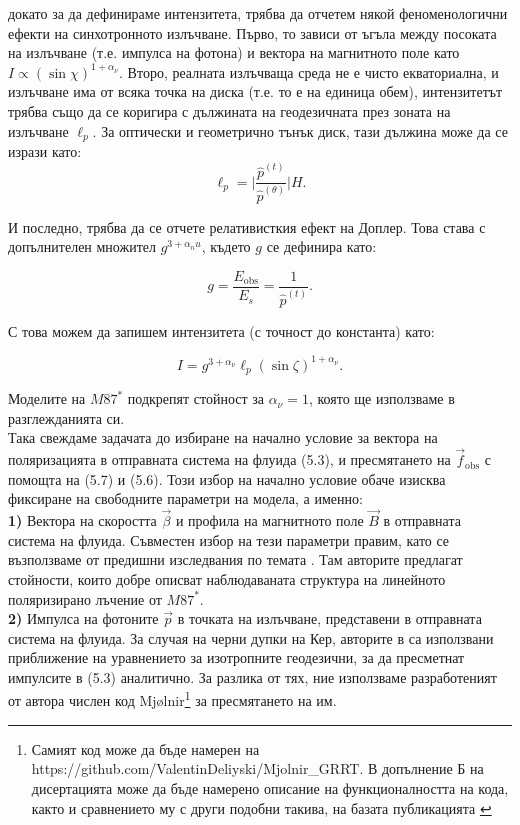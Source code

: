 \documentclass[12pt]{article}
\numberwithin{equation}{section}
\numberwithin{figure}{section}
\begin{document}
	\noindent докато за да дефинираме интензитета, трябва да отчетем някой феноменологични ефекти на синхотронното излъчване. Първо, то зависи от ъгъла между посоката на излъчване (т.е. импулса на фотона) и вектора на магнитното поле като $I\propto \left(\sin\chi\right)^{1+\alpha_\nu}$. Второ, реалната излъчваща среда не е чисто екваториална, и излъчване има от всяка точка на диска (т.е. то е на единица обем), интензитетът трябва също да се коригира с дължината на геодезичната през зоната на излъчване $\ell_p$. За оптически и геометрично тънък диск, тази дължина може да се изрази като:
	\begin{equation}
		\ell_p = \bigg\vert\frac{\hat{p}^{(t)}}{\hat{p}^{(\theta)}}\bigg\vert H.
	\end{equation}
	
	\noindent И последно, трябва да се отчете релативисткия ефект на Доплер. Това става с допълнителен множител $g^{3 + \alpha_nu}$, където $g$ се дефинира като:
	
	\begin{equation}
			g = \frac{E_\text{obs}}{E_s} = \frac{1}{\hat{p}^{(t)}}.
	\end{equation}
	
	\noindent С това можем да запишем интензитета (с точност до константа) като:
	
	\begin{equation}
		I = g^{3 + \alpha_\nu}\ell_p(\sin\zeta)^{1 + \alpha_\nu}.
	\end{equation}
	
	\noindent Моделите на $M87^*$ подкрепят стойност за $\alpha_\nu = 1$, която ще използваме в разглежданията си.\\
	
	Така свеждаме задачата до избиране на начално условие за вектора на поляризацията в отправната система на флуида (5.3), и пресмятането на $\vec{f}_\text{obs}$ с помощта на (5.7) и (5.6). Този избор на начално условие обаче изисква фиксиране на свободните параметри на модела, а именно:\\
	
	\textbf{1)} Вектора на скоростта $\vec{\beta}$ и профила на магнитното поле $\vec{B}$ в отправната система на флуида. Съвместен избор на тези параметри правим, като се възползваме от предишни изследвания по темата \cite{Narayan2021}. Там авторите предлагат стойности, които добре описват наблюдаваната структура на линейното поляризирано лъчение от $M87^*$.\\
	
	\textbf{2)} Импулса на фотоните $\vec{p}$ в точката на излъчване, представени в отправната система на флуида. За случая на черни дупки на Кер, авторите в \cite{Narayan2021} са използвани приближение на уравнението за изотропните геодезични, за да пресметнат импулсите в (5.3) аналитично. За разлика от тях, ние използваме разработеният от автора числен код Mjølnir\footnote{Самият код може да бъде намерен на https://github.com/ValentinDeliyski/Mjolnir\_GRRT. В допълнение Б на дисертацията може да бъде намерено описание на функционалността на кода, както и сравнението му с други подобни такива, на базата публикацията \cite{Gold2020}} за пресмятането на им.
	
\end{document}
